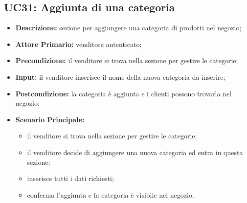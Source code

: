 \subsection{UC31: Aggiunta di una categoria}
\label{sec:UC31}
\begin{itemize}
    \item \textbf{Descrizione:} sezione per aggiungere una categoria di prodotti nel negozio;
    \item \textbf{Attore Primario:} venditore autenticato;
    \item \textbf{Precondizione:} il venditore si trova nella sezione per gestire le categorie;
    \item \textbf{Input:} il venditore inserisce il nome della nuova categoria da inserire;
    \item \textbf{Postcondizione:} la categoria è aggiunta e i clienti possono trovarla nel negozio;
    \item \textbf{Scenario Principale:}
          \begin{itemize}
              \item il venditore si trova nella sezione per gestire le categorie;
              \item il venditore decide di aggiungere una nuova categoria ed entra in questa sezione;
              \item inserisce tutti i dati richiesti;
              \item conferma l'aggiunta e la categoria è visibile nel negozio.
          \end{itemize}
\end{itemize}